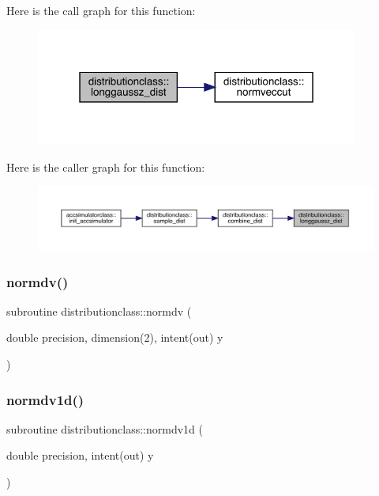 Here is the call graph for this function\+:\nopagebreak
\begin{figure}[H]
\begin{center}
\leavevmode
\includegraphics[width=301pt]{namespacedistributionclass_ab34be02e18a0166b3b2c945e0f68b9ca_cgraph}
\end{center}
\end{figure}
Here is the caller graph for this function\+:\nopagebreak
\begin{figure}[H]
\begin{center}
\leavevmode
\includegraphics[width=350pt]{namespacedistributionclass_ab34be02e18a0166b3b2c945e0f68b9ca_icgraph}
\end{center}
\end{figure}
\mbox{\label{namespacedistributionclass_a00377c8aa90fa9dc8b222d71d019f936}} 
\subsubsection{\texorpdfstring{normdv()}{normdv()}}
{\footnotesize\ttfamily subroutine distributionclass\+::normdv (\begin{DoxyParamCaption}\item[{double precision, dimension(2), intent(out)}]{y }\end{DoxyParamCaption})}

\mbox{\label{namespacedistributionclass_ac36fd92d83720ca88efee259d51ec474}} 
\subsubsection{\texorpdfstring{normdv1d()}{normdv1d()}}
{\footnotesize\ttfamily subroutine distributionclass\+::normdv1d (\begin{DoxyParamCaption}\item[{double precision, intent(out)}]{y }\end{DoxyParamCaption})}

